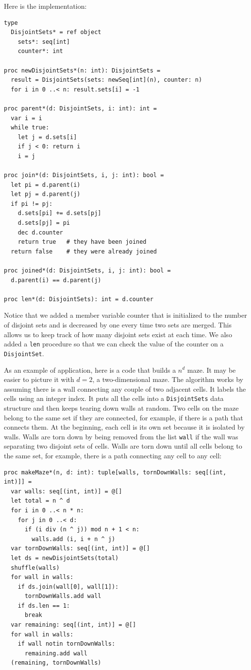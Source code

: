 \documentclass[justified, sixbynine]{tufte-book}
\def\ft{\small\tt}
\theoremstyle{plain}%
\newtheorem * {corollary}{Corollary}
\theoremstyle{definition}
\theoremstyle{remark}
\newtheorem * {remark}{Remark}
\newtheorem * {note}{Note}
\begin{document}
\begin{fullwidth}
Here is the implementation:


\begin{lstlisting}[caption={in file: {\ft nlib/graph.nim}}]
type
  DisjointSets* = ref object
    sets*: seq[int]
    counter*: int

proc newDisjointSets*(n: int): DisjointSets =
  result = DisjointSets(sets: newSeq[int](n), counter: n)
  for i in 0 ..< n: result.sets[i] = -1

proc parent*(d: DisjointSets, i: int): int =
  var i = i
  while true:
    let j = d.sets[i]
    if j < 0: return i
    i = j

proc join*(d: DisjointSets, i, j: int): bool =
  let pi = d.parent(i)
  let pj = d.parent(j)
  if pi != pj:
    d.sets[pi] += d.sets[pj]
    d.sets[pj] = pi
    dec d.counter
    return true   # they have been joined
  return false    # they were already joined

proc joined*(d: DisjointSets, i, j: int): bool =
  d.parent(i) == d.parent(j)

proc len*(d: DisjointSets): int = d.counter
\end{lstlisting}

Notice that we added a member variable counter that is initialized to the number of disjoint sets and is decreased by one every time two sets are merged. This allows us to keep track of how many disjoint sets exist at each time. We also added a {\ft len} procedure so that we can check the value of the counter on a {\ft DisjointSet}.

As an example of application, here is a code that builds a $n^d$ maze. It may be easier to picture it with $d=2$, a two-dimensional maze. The algorithm works by assuming there is a wall connecting any couple of two adjacent cells. It labels the cells using an integer index.
It puts all the cells into a {\ft DisjointSets} data structure and then keeps tearing down walls at random. Two cells on the maze belong to the same set if they are connected, for example, if there is a path that connects them. At the beginning, each cell is its own set because it is isolated by walls.
Walls are torn down by being removed from the list {\ft wall} if the wall was separating two disjoint sets of cells. Walls are torn down until all cells belong to the same set, for example, there is a path connecting any cell to any cell:

\begin{lstlisting}[caption={in file: {\ft nlib/graph.nim}}]
proc makeMaze*(n, d: int): tuple[walls, tornDownWalls: seq[(int, int)]] =
  var walls: seq[(int, int)] = @[]
  let total = n ^ d
  for i in 0 ..< n * n:
    for j in 0 ..< d:
      if (i div (n ^ j)) mod n + 1 < n:
        walls.add (i, i + n ^ j)
  var tornDownWalls: seq[(int, int)] = @[]
  let ds = newDisjointSets(total)
  shuffle(walls)
  for wall in walls:
    if ds.join(wall[0], wall[1]):
      tornDownWalls.add wall
    if ds.len == 1:
      break
  var remaining: seq[(int, int)] = @[]
  for wall in walls:
    if wall notin tornDownWalls:
      remaining.add wall
  (remaining, tornDownWalls)
\end{lstlisting}


\end{fullwidth}
\end{document}
